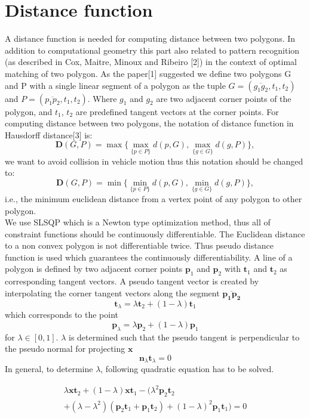 \documentclass[conference]{IEEEtran}
\begin{document}
\section{Distance function}
A distance function is needed for computing distance between two polygons. In addition to computational geometry this part also related to pattern recognition (as described in Cox, Maitre, Minoux and Ribeiro [2]) in the context of optimal matching of two polygon. As the paper[1] suggested we define two polygons G and P with a single linear segment of a polygon as the tuple $G = (\overline{g_{1}g_{2}} ,t_1 ,t_2 ) $ and $ P = (\overline{p_{1}p_{2}} ,t_1 ,t_2 )$. Where $g_1$ and $g_2$ are two adjacent corner points of the polygon, and $t_1$, $t_2$ are predefined tangent vectors at the corner points. For computing distance between two polygons, the notation of distance function in Hausdorff distance[3] is: \\
$$\mathbf{D}(G,P)= \max{\{\max_{\{p\in P\}} d(p,G), \max_{\{g\in G\}}d(g,P)} \},$$
we want to avoid collision in vehicle motion thus this notation should be changed to:\\
\begin{equation}
\mathbf{D}(G,P)= \min{\{\min_{\{p\in P\}} d(p,G), \min_{\{g\in G\}}d(g,P)} \},
\end{equation}
i.e., the minimum euclidean distance from a vertex point of any polygon to other polygon.\\
We use SLSQP which is a Newton type optimization method, thus all of constraint functions should be continuously differentiable. The Euclidean distance to a non convex polygon is not differentiable twice. Thus pseudo distance function is used which guarantees the continuously differentiability. A line of a polygon is defined by two adjacent corner points $\mathbf{p}_1$ and $\mathbf{p}_2$ with $\mathbf{t}_1$  and $\mathbf{t}_2$ as corresponding tangent vectors.
A pseudo tangent vector is created by interpolating the corner tangent vectors along the segment $\mathbf{\overline{p_1p_2}}$ 
$$
\mathbf{t}_\lambda = \lambda \mathbf{t}_2 + (1-\lambda) \mathbf{t}_1
$$
which corresponds to the point 
$$
\mathbf{p}_\lambda = \lambda \mathbf{p}_2 + (1-\lambda) \mathbf{p}_1
$$
for $\lambda \in [0,1]$. $\lambda$ is determined such that the pseudo tangent is perpendicular to the pseudo normal for projecting $\mathbf{x}$ 
$$
\mathbf{n}_\lambda \mathbf{t}_\lambda = 0
$$
In general, to determine $\lambda$, following quadratic equation has to be solved.

\begin{multline}
\lambda \mathbf{x} \mathbf{t}_2 + (1-\lambda) \mathbf{x}\mathbf{t}_1 - (\lambda^2\mathbf{p}_2 \mathbf{t}_2 \\+(\lambda-\lambda^2)(\mathbf{p}_2 \mathbf{t}_1 +\mathbf{p}_1 \mathbf{t}_2) +(1- \lambda)^2 \mathbf{p}_1 \mathbf{t}_1) = 0
\end{multline}
\end{document}
